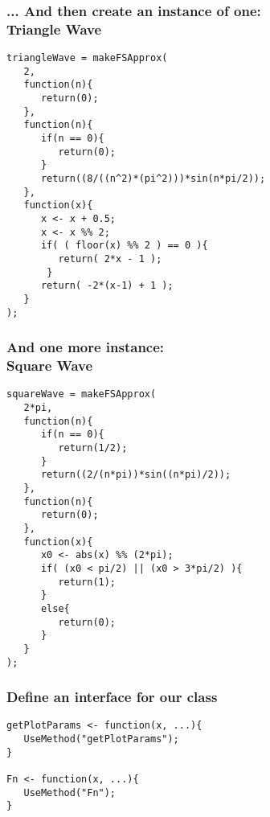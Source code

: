 \documentclass{beamer}
\begin{document}
\begin{frame}[fragile]
   \frametitle{... And then create an instance of one: \\Triangle Wave}
   \begin{center}
   \begin{minipage}{100mm}
   \begin{lstlisting}
triangleWave = makeFSApprox(
   2,
   function(n){
      return(0);
   },
   function(n){
      if(n == 0){
         return(0);
      }
      return((8/((n^2)*(pi^2)))*sin(n*pi/2));
   },
   function(x){
      x <- x + 0.5;
      x <- x %% 2;
      if( ( floor(x) %% 2 ) == 0 ){
         return( 2*x - 1 );
       }
      return( -2*(x-1) + 1 );
   }
);
   \end{lstlisting}
   \end{minipage}
   \end{center}
\end{frame}

\begin{frame}[fragile]
   \frametitle{And one more instance: \\Square Wave}
   \begin{center}
   \begin{minipage}{100mm}
   \begin{lstlisting}
squareWave = makeFSApprox(
   2*pi,
   function(n){
      if(n == 0){
         return(1/2);
      }
      return((2/(n*pi))*sin((n*pi)/2));
   },
   function(n){
      return(0);
   },
   function(x){
      x0 <- abs(x) %% (2*pi);
      if( (x0 < pi/2) || (x0 > 3*pi/2) ){
         return(1);
      }
      else{
         return(0);
      }
   }
);
   \end{lstlisting}
   \end{minipage}
   \end{center}
\end{frame}

\begin{frame}[fragile]
   \frametitle{Define an interface for our class}
   \begin{center}
   \begin{minipage}{100mm}
   \begin{lstlisting}
getPlotParams <- function(x, ...){
   UseMethod("getPlotParams");
}

Fn <- function(x, ...){
   UseMethod("Fn");
}
   \end{lstlisting}
   \end{minipage}
   \end{center}
\end{frame}
\end{document}
